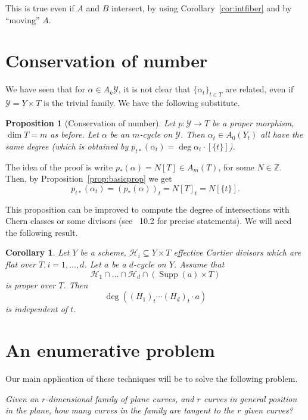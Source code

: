 \documentclass[leqno, openany]{memoir}
\newtheorem{cor}[thm]{Corollary}
\newtheorem{prop}[thm]{Proposition}
\theoremstyle{definition}
\theoremstyle{remark}
\theoremstyle{plain}
\theoremstyle{definition}
\theoremstyle{remark}
\newcommand{\Z}{\mathbb{Z}}
\newcommand{\mc}[1]{\mathcal{#1}}
\DeclareMathOperator{\Supp}{Supp}
\begin{document}
This is true even if $A$ and $B$ intersect, by using Corollary~\ref{cor:intfiber} and by ``moving'' $A$. 

\section{Conservation of number}

We have seen that for $\alpha \in A_k\mc{Y}$, it is not clear that ${\{\alpha_t\}}_{t \in T}$ are related, even if $\mc{Y}=Y \times T$ is the trivial family.  We have the following substitute.

\begin{prop}[Conservation of number]
Let $p\colon \mc{Y} \to T$ be a proper morphism, $\dim T=m$ as before. Let $\alpha$ be an $m$-cycle on $\mc{Y}$. Then $\alpha_t \in A_0(Y_t)$ all have the same degree (which is obtained by $p_{t\ast}(\alpha_t)=\deg \alpha_t\cdot [\{t\}]$). 
\end{prop}

The idea of the proof is write $p_\ast(\alpha)=N[T] \in A_m(T)$, for some $N \in \Z$. Then, by Proposition~\ref{prop:basicprop} we get
\[ p_{t\ast}(\alpha_t)={ (p_\ast(\alpha)) }_t = { N[T] }_t= N[\{t\}]. \]

This proposition can be improved to compute the degree of intersections with Chern classes or some divisors (see \textsection~10.2 for precise statements). We will need the following result.

\begin{cor}
Let $Y$ be a scheme, $\mc{H}_i \subseteq Y \times T$ effective Cartier divisors which are flat over $T, i=1, \dots, d$. Let $a$ be a $d$-cycle on $Y$. Assume that
\[ \mc{H}_1 \cap \dots \cap \mc{H}_d \cap (\Supp(a) \times T) \]
is proper over $T$. Then
\[ \deg({ (H_1) }_t \cdots { (H_d) }_t \cdot a) \]
is independent of $t$. 
\end{cor}

\section{An enumerative problem}

Our main application of these techniques will be to solve the following problem.
\begin{center}
\emph{Given an $r$-dimensional family of plane curves, and $r$ curves in general position in the plane, how many curves in the family are tangent to the $r$ given curves?}
\end{center}
\end{document}
